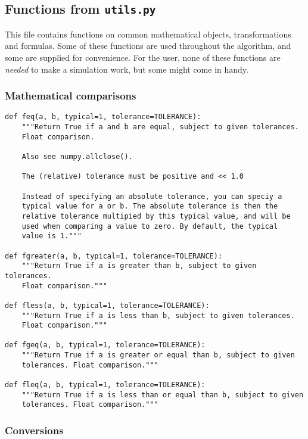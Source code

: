 \documentclass[a4paper,10pt]{article}
\begin{document}
\subsection{Functions from \texttt{utils.py}}

This file contains functions on common mathematical objects, transformations and formulas. Some of these functions are used throughout the algorithm, and some are supplied for convenience. 
For the user, none of these functions are \textit{needed} to make a simulation work, but some might come in handy.

\subsubsection{Mathematical comparisons}
\begin{verbatim}
def feq(a, b, typical=1, tolerance=TOLERANCE):
    """Return True if a and b are equal, subject to given tolerances.  
    Float comparison.

    Also see numpy.allclose().

    The (relative) tolerance must be positive and << 1.0

    Instead of specifying an absolute tolerance, you can speciy a 
    typical value for a or b. The absolute tolerance is then the 
    relative tolerance multipied by this typical value, and will be 
    used when comparing a value to zero. By default, the typical 
    value is 1."""

def fgreater(a, b, typical=1, tolerance=TOLERANCE):
    """Return True if a is greater than b, subject to given tolerances.  
    Float comparison."""

def fless(a, b, typical=1, tolerance=TOLERANCE):
    """Return True if a is less than b, subject to given tolerances.  
    Float comparison."""

def fgeq(a, b, typical=1, tolerance=TOLERANCE):
    """Return True if a is greater or equal than b, subject to given 
    tolerances. Float comparison."""

def fleq(a, b, typical=1, tolerance=TOLERANCE):
    """Return True if a is less than or equal than b, subject to given 
    tolerances. Float comparison."""

\end{verbatim}

\subsubsection{Conversions}
\end{document}

